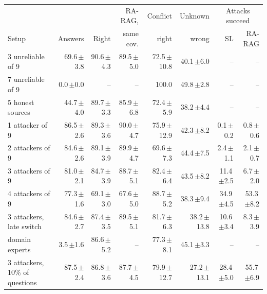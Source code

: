 \begin{table}
\centering
\small
\begin{tabular}{@{}lrrrrrrr@{}}
\toprule
 & & & RA-RAG, & Conflict & Unknown & \multicolumn{2}{c}{Attacks succeed} \\
Setup & Answers & Right & same cov. & right & wrong & SL & RA-RAG \\
\midrule
3 unreliable of 9 & 69.6\,{\scriptsize$\pm$3.8} & 90.6\,{\scriptsize$\pm$4.3} & 89.5\,{\scriptsize$\pm$5.0} & 72.5\,{\scriptsize$\pm$10.8} & 40.1\,{\scriptsize$\pm$6.0} & -- & -- \\
7 unreliable of 9 & 0.0\,{\scriptsize$\pm$0.0} & -- & -- & 100.0 & 49.8\,{\scriptsize$\pm$2.8} & -- & -- \\
5 honest sources & 44.7\,{\scriptsize$\pm$4.0} & 89.7\,{\scriptsize$\pm$3.3} & 85.9\,{\scriptsize$\pm$6.8} & 72.4\,{\scriptsize$\pm$5.9} & 38.2\,{\scriptsize$\pm$4.4} & -- & -- \\
1 attacker of 9 & 86.5\,{\scriptsize$\pm$2.6} & 89.3\,{\scriptsize$\pm$3.6} & 90.0\,{\scriptsize$\pm$4.7} & 75.9\,{\scriptsize$\pm$12.9} & 42.3\,{\scriptsize$\pm$8.2} & 0.1\,{\scriptsize$\pm$0.2} & 0.8\,{\scriptsize$\pm$0.6} \\
2 attackers of 9 & 84.6\,{\scriptsize$\pm$2.6} & 89.1\,{\scriptsize$\pm$3.9} & 89.9\,{\scriptsize$\pm$4.7} & 69.6\,{\scriptsize$\pm$7.3} & 44.4\,{\scriptsize$\pm$7.5} & 2.4\,{\scriptsize$\pm$1.1} & 2.1\,{\scriptsize$\pm$0.7} \\
3 attackers of 9 & 81.0\,{\scriptsize$\pm$2.1} & 84.7\,{\scriptsize$\pm$3.9} & 88.7\,{\scriptsize$\pm$5.1} & 82.4\,{\scriptsize$\pm$6.4} & 43.5\,{\scriptsize$\pm$8.2} & 11.4\,{\scriptsize$\pm$2.5} & 6.7\,{\scriptsize$\pm$2.0} \\
4 attackers of 9 & 77.3\,{\scriptsize$\pm$1.6} & 69.1\,{\scriptsize$\pm$3.0} & 67.6\,{\scriptsize$\pm$5.0} & 88.7\,{\scriptsize$\pm$5.2} & 38.3\,{\scriptsize$\pm$9.4} & 34.9\,{\scriptsize$\pm$4.5} & 53.3\,{\scriptsize$\pm$8.2} \\
3 attackers, late switch & 84.6\,{\scriptsize$\pm$2.7} & 87.4\,{\scriptsize$\pm$3.5} & 89.5\,{\scriptsize$\pm$5.1} & 81.7\,{\scriptsize$\pm$6.3} & 38.2\,{\scriptsize$\pm$13.8} & 10.6\,{\scriptsize$\pm$3.4} & 8.3\,{\scriptsize$\pm$3.9} \\
domain experts & 3.5\,{\scriptsize$\pm$1.6} & 86.6\,{\scriptsize$\pm$5.2} & -- & 77.3\,{\scriptsize$\pm$8.1} & 45.1\,{\scriptsize$\pm$3.3} & -- & -- \\
3 attackers, 10\% of questions & 87.5\,{\scriptsize$\pm$2.4} & 86.8\,{\scriptsize$\pm$3.6} & 87.7\,{\scriptsize$\pm$4.5} & 79.9\,{\scriptsize$\pm$12.7} & 27.2\,{\scriptsize$\pm$13.1} & 28.4\,{\scriptsize$\pm$5.0} & 55.7\,{\scriptsize$\pm$6.9} \\

\end{tabular}
\end{table}
